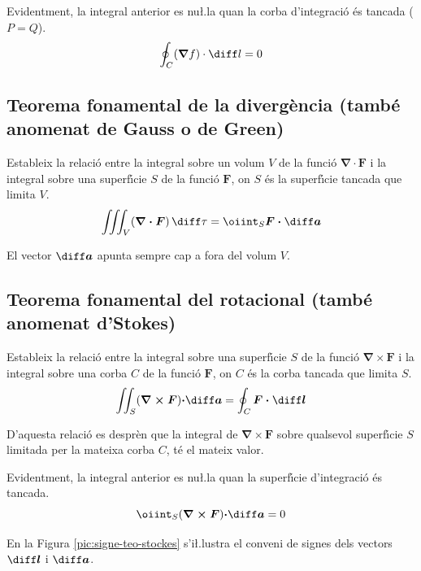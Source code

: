 \documentclass[catalan,a4paper,twoside,11pt]{article}
\begin{document}
Evidentment, la integral anterior es nu{\l.l}a quan la corba d'integraci\'{o} \'{e}s tancada ($P=Q$).
\begin{equation}
    \oint_C (\boldsymbol{\nabla}f) \cdot \diff l = 0
\end{equation}

\subsection{Teorema fonamental de la diverg\`{e}ncia (tamb\'{e} anomenat de Gauss o de Green)}
Estableix la relaci\'{o} entre la integral sobre un volum $V$ de la funci\'{o} $\boldsymbol{\nabla\cdot F}$ i la integral sobre una superf\'{\i}cie $S$ de la funci\'{o} $\boldsymbol{F}$, on $S$ \'{e}s la superf\'{\i}cie tancada que limita $V$.
\begin{equation}
    \iiint_V(\boldsymbol{\nabla\cdot F})\,\diff \tau = \oiint_S\boldsymbol{F\cdot\diff a}
\end{equation}

El vector $\boldsymbol{\diff a}$ apunta sempre cap a fora del volum $V$.

\subsection{Teorema fonamental del rotacional (tamb\'{e} anomenat d'Stokes)}
Estableix la relaci\'{o} entre la integral sobre una superf\'{\i}cie $S$ de la funci\'{o} $\boldsymbol{\nabla\times F}$ i la integral sobre una corba $C$ de la funci\'{o} $\boldsymbol{F}$, on $C$ \'{e}s la corba tancada que limita $S$.
\begin{equation}
    \iint_S(\boldsymbol{\nabla\times F})\boldsymbol{\cdot\diff a} =
    \oint_C\boldsymbol{F\cdot\diff l}
\end{equation}

D'aquesta relaci\'{o} es despr\`{e}n que la integral de $\boldsymbol{\nabla\times F}$ sobre qualsevol superf\'{\i}cie $S$ limitada per la mateixa corba $C$, t\'{e} el mateix valor.

Evidentment, la integral anterior es nu{\l.l}a quan la superf\'{\i}cie d'integraci\'{o} \'{e}s tancada.
\begin{equation}
    \oiint_S(\boldsymbol{\nabla\times F})\boldsymbol{\cdot\diff a} = 0
\end{equation}

En la Figura \vref{pic:signe-teo-stockes} s'i{\l.l}ustra el conveni de
signes dels vectors $\boldsymbol{\diff l}$ i $\boldsymbol{\diff a}$.
\end{document}
